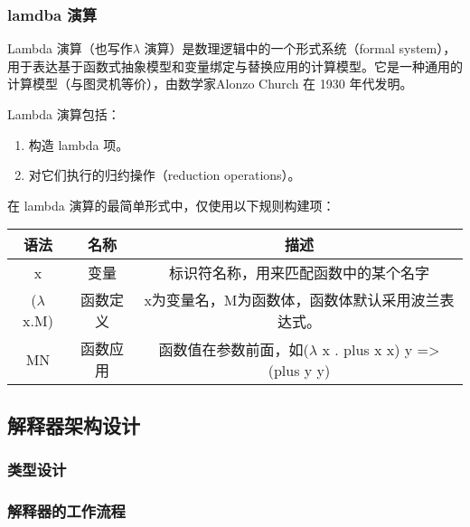 \hypertarget{section-1}{%
\subsubsection{}\label{section-1}}

\hypertarget{lamdba-ux6f14ux7b97}{%
\subsubsection{lamdba 演算}\label{lamdba-ux6f14ux7b97}}

Lambda 演算（也写作\(\lambda\) 演算）是数理逻辑中的一个形式系统（formal
system），用于表达基于函数式抽象模型和变量绑定与替换应用的计算模型。它是一种通用的计算模型（与图灵机等价），由数学家Alonzo
Church 在 1930 年代发明。

Lambda 演算包括：

\begin{enumerate}
\def\labelenumi{\arabic{enumi}.}
\item
  构造 lambda 项。
\item
  对它们执行的归约操作（reduction operations）。
\end{enumerate}

在 lambda 演算的最简单形式中，仅使用以下规则构建项：

\begin{longtable}[]{@{}ccc@{}}
\toprule
语法 & 名称 & 描述 \\
\midrule
\endhead
x & 变量 & 标识符名称，用来匹配函数中的某个名字 \\
(\(\lambda\) x.M) & 函数定义 &
x为变量名，M为函数体，函数体默认采用波兰表达式。 \\
MN & 函数应用 & 函数值在参数前面，如(\(\lambda\) x . plus x x) y
=\textgreater{} (plus y y) \\
\bottomrule
\end{longtable}

\hypertarget{ux89e3ux91caux5668ux67b6ux6784ux8bbeux8ba1}{%
\subsection{解释器架构设计}\label{ux89e3ux91caux5668ux67b6ux6784ux8bbeux8ba1}}

\hypertarget{ux7c7bux578bux8bbeux8ba1}{%
\subsubsection{类型设计}\label{ux7c7bux578bux8bbeux8ba1}}

\hypertarget{ux89e3ux91caux5668ux7684ux5de5ux4f5cux6d41ux7a0b}{%
\subsubsection{解释器的工作流程}\label{ux89e3ux91caux5668ux7684ux5de5ux4f5cux6d41ux7a0b}}

